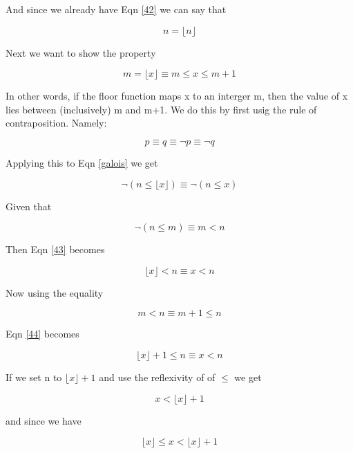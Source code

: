 \documentclass[10pt,a4paper]{article}
\providecommand{\floor}[1]{\lfloor #1 \rfloor  }
\begin{document}
And since we already have Eqn \ref{42} we can say that

\begin{equation}
n = \floor{n}
\end{equation}


Next we want to show the property

\begin{equation}
 m = \floor{x} \equiv m \le x \le m+1
 \label{45}
\end{equation}

In other words, if the floor function maps x to an interger m, then the value of x lies between (inclusively) m and m+1. We do this by first usig the rule of contraposition. Namely:

\begin{equation}
 p\equiv q \equiv \neg p \equiv \neg q
\end{equation}

Applying this to Eqn \ref{galois} we get

\begin{equation}
\neg(n \le \floor{x}) \equiv \neg(n \le x)
\label{43}
\end{equation}

Given that 

\begin{equation}
 \neg(n\le m) \equiv m < n
\end{equation}

Then Eqn \ref{43} becomes

\begin{equation}
 \floor{x} < n \equiv x < n
 \label{44}
\end{equation}

Now using the equality

\begin{equation}
 m <n \equiv m+1 \le n
\end{equation}

Eqn \ref{44} becomes

\begin{equation}
 \floor{x} +1 \le n \equiv x < n
\end{equation}

If we set n to $\floor{x} +1$ and use the reflexivity of  of $\le$ we get

\begin{equation}
x < \floor{x} +1
\end{equation}

and since we have 

\begin{equation}
 \floor{x} \le x < \floor{x} + 1
\end{equation}
\end{document}
